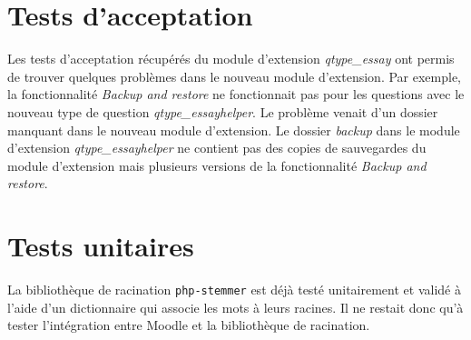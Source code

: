 \section{Tests d'acceptation}

Les tests d'acceptation récupérés du module d'extension \textit{qtype\_essay} ont permis de trouver quelques problèmes  dans le nouveau module d'extension.
Par exemple, la fonctionnalité \textit{Backup and restore} ne fonctionnait pas pour les questions avec le nouveau type de question \textit{qtype\_essayhelper}.
Le problème venait d'un dossier manquant dans le nouveau module d'extension.
Le dossier \textit{backup} dans le module d'extension \textit{qtype\_essayhelper} ne contient pas des copies de sauvegardes du module d'extension mais plusieurs versions de la fonctionnalité \textit{Backup and restore}.

\section{Tests unitaires}

La biblioth\`eque de racination \texttt{php-stemmer} est déjà testé unitairement et validé à l'aide d'un dictionnaire qui associe les mots à leurs racines.
Il ne restait donc qu'à tester l'int\'egration entre Moodle et la biblioth\`eque de racination.
